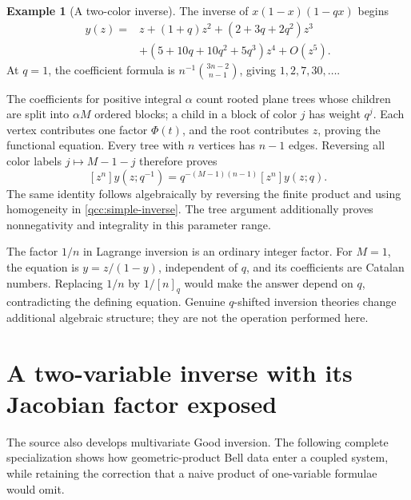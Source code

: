 \documentclass[11pt,a4paper,oneside,openany]{book}
\theoremstyle{definition}
\newtheorem{example}[theorem]{Example}
\theoremstyle{remark}
\begin{document}
\begin{example}[A two-color inverse]\label{qcc:inverse-example}
The inverse of \(x(1-x)(1-qx)\) begins
\begin{align*}
 y(z)={}&z+(1+q)z^2+(2+3q+2q^2)z^3\\
       &+(5+10q+10q^2+5q^3)z^4+O(z^5).
\end{align*}
At \(q=1\), the coefficient formula is
\(n^{-1}\binom{3n-2}{n-1}\), giving \(1,2,7,30,\ldots\).
\end{example}
The coefficients for positive integral \(\alpha\) count rooted plane trees
whose children are split into \(\alpha M\) ordered blocks; a child in a block of
color \(j\) has weight \(q^j\). Each vertex contributes one factor
\(\Phi(t)\), and the root contributes \(z\), proving the functional equation.
Every tree with \(n\) vertices has \(n-1\) edges. Reversing all color labels
\(j\mapsto M-1-j\) therefore proves
\begin{equation}\label{qcc:inverse-reciprocity}
 [z^n]y(z;q^{-1})=q^{-(M-1)(n-1)}[z^n]y(z;q).
\end{equation}
The same identity follows algebraically by reversing the finite product and using
homogeneity in \eqref{qcc:simple-inverse}. The tree argument additionally proves
nonnegativity and integrality in this parameter range.

\begin{auditbox}[title={Ordinary inversion is not obtained by replacing \(n\) with \([n]_q\)}]
The factor \(1/n\) in Lagrange inversion is an ordinary integer factor. For
\(M=1\), the equation is \(y=z/(1-y)\), independent of \(q\), and its
coefficients are Catalan numbers. Replacing \(1/n\) by \(1/[n]_q\) would make
the answer depend on \(q\), contradicting the defining equation. Genuine
\(q\)-shifted inversion theories change additional algebraic structure; they
are not the operation performed here.
\end{auditbox}

\section{A two-variable inverse with its Jacobian factor exposed}
The source also develops multivariate Good inversion. The following complete
specialization shows how geometric-product Bell data enter a coupled system,
while retaining the correction that a naive product of one-variable formulae
would omit.
\end{document}
